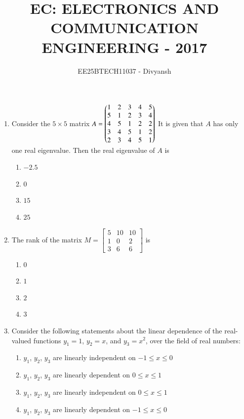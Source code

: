 \documentclass[journal,12pt,onecolumn]{IEEEtran}
\title{EC: ELECTRONICS AND COMMUNICATION ENGINEERING - 2017}
\author{EE25BTECH11037 - Divyansh}
\theoremstyle{remark}
\begin{document}
\maketitle

\begin{enumerate}

\item Consider the $5 \times 5$ matrix  
$
A = \begin{pmatrix}1 & 2 & 3 & 4 & 5 \\
5 & 1 & 2 & 3 & 4 \\
4 & 5 & 1 & 2 & 2 \\
3 & 4 & 5 & 1 & 2 \\
2 &3 & 4 & 5 & 1\end{pmatrix}
$ 
It is given that $A$ has only one real eigenvalue. Then the real eigenvalue of $A$ is  
\begin{multicols}{4}
\begin{enumerate}
\item $-2.5$
\item $0$
\item $15$
\item $25$
\end{enumerate}
\end{multicols}
\hfill {}

\item The rank of the matrix 
$
M = \begin{bmatrix}
5 & 10 & 10 \\
1 & 0 & 2 \\
3 & 6 & 6
\end{bmatrix}
$ is  
\begin{multicols}{4}
\begin{enumerate}
\item $0$
\item $1$
\item $2$
\item $3$
\end{enumerate}
\end{multicols}
\hfill {}

\item Consider the following statements about the linear dependence of the real-valued functions $y_1 = 1$, $y_2 = x$, and $y_3 = x^2$, over the field of real numbers:  
\begin{enumerate}[label=\Roman*.]
    \item $y_1$, $y_2$, $y_3$ are linearly independent on $-1 \leq x \leq 0$ 
    \item $y_1$, $y_2$, $y_3$ are linearly dependent on $0 \leq x \leq 1$
    \item $y_1$, $y_2$, $y_3$ are linearly independent on $0 \leq x \leq 1$
    \item $y_1$, $y_2$, $y_3$ are linearly dependent on $-1 \leq x \leq 0$
\end{enumerate}
 

\end{enumerate}
\end{document}

